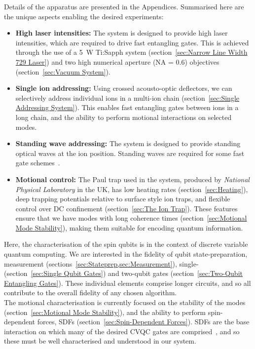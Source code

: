     Details of the apparatus are presented in the Appendices. Summarised here are the unique aspects enabling the desired experiments:
    \begin{itemize}
    \item \textbf{High laser intensities:} The system is designed to provide
        high laser intensities, which are required to drive fast entangling
        gates. This is achieved through the use of a 5~W Ti:Sapph system (section~\ref{sec:Narrow Line Width 729 Laser}) and
        two high numerical aperture (NA = 0.6) objectives (section~\ref{sec:Vacuum System}).
    \item \textbf{Single ion addressing:} Using crossed acousto-optic
        deflectors, we can selectively address individual ions in a multi-ion chain (section~\ref{sec:Single Addressing System}).
        This enables fast entangling gates between ions in a long
        chain, and the ability to perform motional interactions on selected modes.
    \item \textbf{Standing wave addressing:} The system is designed to provide
        standing optical waves at the ion position. Standing waves are required for
        some fast gate schemes~\cite{saner2023breaking}. 
    \item \textbf{Motional control:} The Paul trap used in the system, produced
        by \emph{National Physical Laboratory} in the UK, has low heating rates (section~\ref{sec:Heating}),
        deep trapping potentials relative to surface style ion traps, and flexible
        control over DC confinement (section~\ref{sec:The Ion Trap}). These features ensure that we have modes
        with long coherence times (section~\ref{sec:Motional Mode Stability}), making them suitable for encoding quantum
        information.
    \end{itemize}

    Here, the characterisation of the spin qubits is in the context of discrete
    variable quantum computing. We are interested in the fidelity of qubit
    state-preparation, measurement (sections~\ref{sec:Stateprep,sec:Measurement}), single- (section~\ref{sec:Single Qubit Gates}) and two-qubit gates (section~\ref{sec:Two-Qubit Entangling Gates}). These
    individual elements comprise longer circuits, and so all contribute to the
    overall fidelity of any chosen algorithm.\\
    The motional characterisation is currently focused on the stability of the
    modes (section~\ref{sec:Motional Mode Stability}), and the ability to perform spin-dependent forces, SDFs (section~\ref{sec:Spin-Dependent Forces}). SDFs are the
    base interaction on which many of the desired CVQC gates are
    comprised~\cite{sutherland2021universal}, and so these must be well
    characterised and understood in our system.\\

